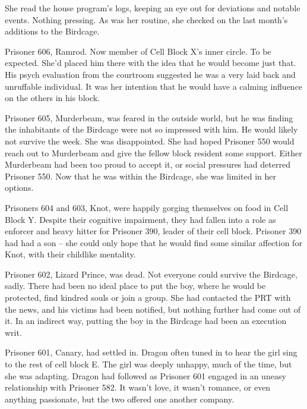 She read the house program's logs, keeping an eye out for deviations and notable events.  Nothing pressing.  As was her routine, she checked on the last month's additions to the Birdcage.



Prisoner 606, Ramrod.  Now member of Cell Block X's inner circle.  To be expected.  She'd placed him there with the idea that he would become just that.  His psych evaluation from the courtroom suggested he was a very laid back and unruffable individual.  It was her intention that he would have a calming influence on the others in his block.



Prisoner 605, Murderbeam, was feared in the outside world, but he was finding the inhabitants of the Birdcage were not so impressed with him.  He would likely not survive the week.  She was disappointed.  She had hoped Prisoner 550 would reach out to Murderbeam and give the fellow block resident some support.  Either Murderbeam had been too proud to accept it, or social pressures had deterred Prisoner 550.  Now that he was within the Birdcage, she was limited in her options.



Prisoners 604 and 603, Knot, were happily gorging themselves on food in Cell Block Y.  Despite their cognitive impairment, they had fallen into a role as enforcer and heavy hitter for Prisoner 390, leader of their cell block.  Prisoner 390 had had a son – she could only hope that he would find some similar affection for Knot, with their childlike mentality.



Prisoner 602, Lizard Prince, was dead.  Not everyone could survive the Birdcage, sadly.  There had been no ideal place to put the boy, where he would be protected, find kindred souls or join a group.  She had contacted the PRT with the news, and his victims had been notified, but nothing further had come out of it.  In an indirect way, putting the boy in the Birdcage had been an execution writ.



Prisoner 601, Canary, had settled in.  Dragon often tuned in to hear the girl sing to the rest of cell block E.  The girl was deeply unhappy, much of the time, but she was adapting.  Dragon had followed as Prisoner 601 engaged in an uneasy relationship with Prisoner 582.  It wasn't love, it wasn't romance, or even anything passionate, but the two offered one another company.




